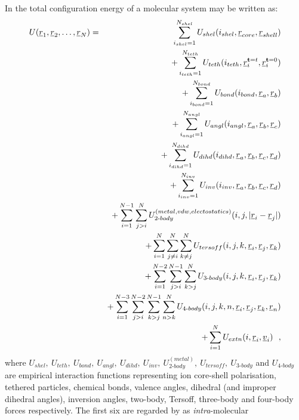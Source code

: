 In \D the total configuration energy of a molecular system may
be written as:
\begin{eqnarray}\label{eq:decomp-ene}
U(\mbox{$\underline{r}$}_{1},\mbox{$\underline{r}$}_{2},\ldots,\mbox{$\underline{r}$}_{N})&=&
      \sum_{i_{shel}=1}^{N_{shel}} U_{shel}(i_{shel},\mbox{$\underline{r}$}_{core},\mbox{$\underline{r}$}_{shell}) \nonumber \\
& & + \sum_{i_{teth}=1}^{N_{teth}} U_{teth}(i_{teth},\mbox{$\underline{r}$}_{i}^{{\bf t}=t},\mbox{$\underline{r}$}_{i}^{{\bf t}=0}) \nonumber \\
& & + \sum_{i_{bond}=1}^{N_{bond}} U_{bond}(i_{bond},\mbox{$\underline{r}$}_{a},\mbox{$\underline{r}$}_{b}) \nonumber \\
& & + \sum_{i_{angl}=1}^{N_{angl}} U_{angl}(i_{angl},\mbox{$\underline{r}$}_{a},\mbox{$\underline{r}$}_{b},\mbox{$\underline{r}$}_{c}) \nonumber \\
& & + \sum_{i_{dihd}=1}^{N_{dihd}} U_{dihd}(i_{dihd},\mbox{$\underline{r}$}_{a},\mbox{$\underline{r}$}_{b},\mbox{$\underline{r}$}_{c},\mbox{$\underline{r}$}_{d}) \nonumber \\
& & + \sum_{i_{inv}=1}^{N_{inv}} U_{inv}(i_{inv},\mbox{$\underline{r}$}_{a},\mbox{$\underline{r}$}_{b},\mbox{$\underline{r}$}_{c},\mbox{$\underline{r}$}_{d}) \nonumber \\
& & + \sum_{i=1}^{N-1}\sum_{j>i}^{N} U_{2\textrm{-}body}^{(metal,vdw,electostatics)}(i,j,|\mbox{$\underline{r}$}_{i}-\mbox{$\underline{r}$}_{j}|) \\
& & + \sum_{i=1}^{N}\sum_{j{\ne}i}^{N}\sum_{k{\ne}j}^{N} U_{tersoff}(i,j,k,\mbox{$\underline{r}$}_{i},\mbox{$\underline{r}$}_{j},\mbox{$\underline{r}$}_{k}) \nonumber \\
& & + \sum_{i=1}^{N-2}\sum_{j>i}^{N-1}\sum_{k>j}^{N} U_{3\textrm{-}body}(i,j,k,\mbox{$\underline{r}$}_{i},\mbox{$\underline{r}$}_{j},\mbox{$\underline{r}$}_{k}) \nonumber \\
& & + \sum_{i=1}^{N-3}\sum_{j>i}^{N-2}\sum_{k>j}^{N-1}\sum_{n>k}^{N} U_{4\textrm{-}body}(i,j,k,n,\mbox{$\underline{r}$}_{i},\mbox{$\underline{r}$}_{j},\mbox{$\underline{r}$}_{k},\mbox{$\underline{r}$}_{n}) \nonumber \\
& & + \sum_{i=1}^{N}U_{extn}(i,\mbox{$\underline{r}$}_{i},\mbox{$\underline{v}$}_{i})~~,\nonumber
\end{eqnarray}
where
$U_{shel},~U_{teth},~U_{bond},~U_{angl},~U_{dihd},~U_{inv},~U^{(metal)}_{2\textrm{-}body},
~U_{tersoff},~U_{3\textrm{-}body}$ and $U_{4\textrm{-}body}$ are empirical interaction
functions representing
ion core-shell polarisation,
tethered particles,
chemical bonds,
valence angles,
dihedral
(and improper dihedral angles),
inversion angles,
two-body,
Tersoff,
three-body and
four-body forces respectively.  The
first six are regarded by \D as {\em intra}-molecular
